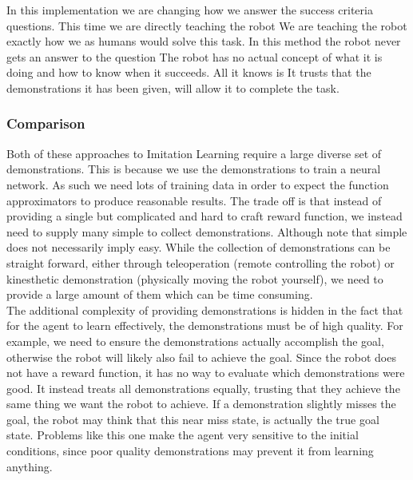 In this implementation we are changing how we answer the success criteria questions. This time we are directly teaching the robot  We are teaching the robot exactly how we as humans would solve this task. In this method the robot never gets an answer to the question  The robot has no actual concept of what it is doing and how to know when it succeeds. All it knows is  It trusts that the demonstrations it has been given, will allow it to complete the task.

\subsubsection{Comparison} %
Both of these approaches to Imitation Learning require a large diverse set of demonstrations. This is because we use the demonstrations to train a neural network. As such we need lots of training data in order to expect the function approximators to produce reasonable results. The trade off is that instead of providing a single but complicated and hard to craft reward function, we instead need to supply many simple to collect demonstrations. Although note that simple does not necessarily imply easy. While the collection of demonstrations can be straight forward, either through teleoperation (remote controlling the robot) or kinesthetic demonstration (physically moving the robot yourself), we need to provide a large amount of them which can be time consuming.\\

The additional complexity of providing demonstrations is hidden in the fact that for the agent to learn effectively, the demonstrations must be of high quality. For example, we need to ensure the demonstrations actually accomplish the goal, otherwise the robot will likely also fail to achieve the goal. Since the robot does not have a reward function, it has no way to evaluate which demonstrations were good. It instead treats all demonstrations equally, trusting that they achieve the same thing we want the robot to achieve. If a demonstration slightly misses the goal, the robot may think that this near miss state, is actually the true goal state. Problems like this one make the agent very sensitive to the initial conditions, since poor quality demonstrations may prevent it from learning anything.

